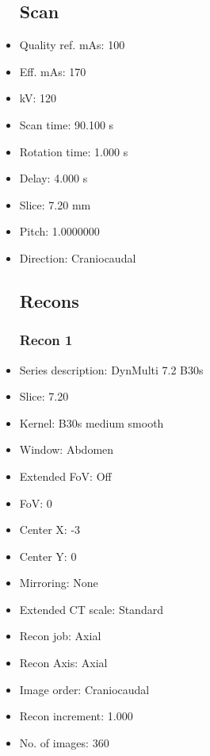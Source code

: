 \documentclass[12pt]{article}
\begin{document}
\begin{itemize}[noitemsep]
\subsection{Scan}
\item Quality ref. mAs: 100\item Eff. mAs: 170\item kV: 120\item Scan time: 90.100 s\item Rotation time: 1.000 s\item Delay: 4.000 s\item Slice: 7.20 mm\item Pitch: 1.0000000\item Direction: Craniocaudal\subsection{Recons}

\subsubsection{Recon 1}
\item Series description: DynMulti 7.2 B30s
\item Slice: 7.20
\item Kernel: B30s medium smooth
\item Window: Abdomen
\item Extended FoV: Off
\item FoV: 0
\item Center X: -3
\item Center Y: 0
\item Mirroring: None
\item Extended CT scale: Standard
\item Recon job: Axial
\item Recon Axis: Axial
\item Image order: Craniocaudal
\item Recon increment: 1.000
\item No. of images: 360
\end{itemize}
\end{document}
